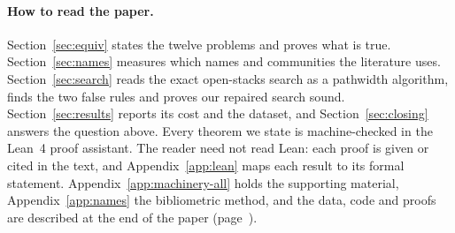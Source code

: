 \paragraph{How to read the paper.} Section~\ref{sec:equiv} states the twelve
problems and proves what is true. Section~\ref{sec:names} measures which names
and communities the literature uses. Section~\ref{sec:search} reads the exact
open-stacks search as a pathwidth algorithm, finds the two false rules and
proves our repaired search sound. Section~\ref{sec:results} reports its cost
and the dataset, and Section~\ref{sec:closing} answers the question above.
Every theorem we state is machine-checked in the Lean~4 proof assistant. The
reader need not read Lean: each proof is given or cited in the text, and
Appendix~\ref{app:lean} maps each result to its formal statement.
Appendix~\ref{app:machinery-all} holds the supporting material,
Appendix~\ref{app:names} the bibliometric method, and the data,
code and proofs are described at the end of the paper (page~\pageref{sec:data}).
